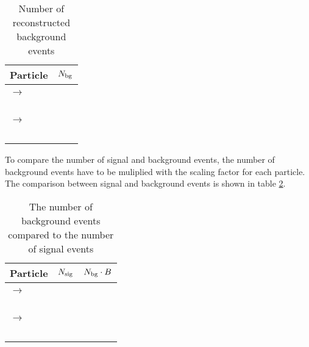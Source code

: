 \begin{table}
	\centering
	\caption{Number of reconstructed background events}
	\label{tab:bg_reco_without_scaling}
	\begin{tabular}{lc}
		\hline
		Particle & $N_{\textnormal{bg}}$ \\
		\hline
		\hline
		&\\
		\pbarpSystem $\rightarrow$ \excitedcascade \anticascade &\\
		\lam & \\
		\alam & \\
		\anticascade & \\
		\excitedcascade & \\
		\excitedcascade \anticascade & \\
		\hline
		\pbarpSystem $\rightarrow$ \cascade \excitedanticascade & \\
		\lam & \\
		\alam & \\
		\cascade & \\
		\excitedanticascade & \\
		\excitedanticascade \cascade &\\
		\hline
		  
	\end{tabular}
\end{table}
To compare the number of signal and background events, the number of background events have to be muliplied with the scaling factor for each particle.
The comparison between signal and background events is shown in table \ref{bg_compared_reco_with_scaling}.

\begin{table}
	\centering
	\caption{\propose The number of background events compared to the number of signal events}
	\label{bg_compared_reco_with_scaling}
	\begin{tabular}{lcc}
		\hline
		Particle & $N_{\textnormal{sig}}$ & $N_{\textnormal{bg}} \cdot B$ \\
		\hline
		\hline
		& &\\
		\pbarpSystem $\rightarrow$ \excitedcascade \anticascade & &\\
		\lam & & \\
		\alam & & \\
		\anticascade & & \\
		\excitedcascade & & \\
		\excitedcascade \anticascade & & \\
		\hline
		\pbarpSystem $\rightarrow$ \cascade \excitedanticascade & & \\
		\lam & & \\
		\alam & & \\
		\cascade & & \\
		\excitedanticascade & & \\
		\excitedanticascade \cascade & &\\
		\hline
		  
	\end{tabular}
\end{table}
	